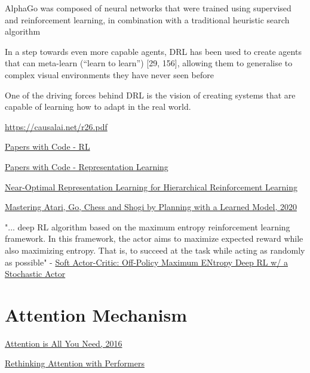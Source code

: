 AlphaGo
was composed of neural networks that were trained using
supervised and reinforcement learning, in combination with
a traditional heuristic search algorithm


In a step towards even more capable agents,
DRL has been used to create agents that can meta-learn (“learn
to learn”) [29, 156], allowing them to generalise to complex
visual environments they have never seen before

One of the
driving forces behind DRL is the vision of creating systems
that are capable of learning how to adapt in the real world.








\cite{sorokin2015deep}




\url{https://causalai.net/r26.pdf}

\href{https://paperswithcode.com/methods/area/reinforcement-learning}{Papers with Code - RL}

\href{https://paperswithcode.com/task/representation-learning}{Papers with Code - Representation Learning}

\href{https://paperswithcode.com/paper/near-optimal-representation-learning-for}{	Near-Optimal Representation Learning for Hierarchical Reinforcement Learning}

\href{https://arxiv.org/pdf/1911.08265.pdf}{Mastering Atari, Go, Chess and Shogi by Planning with a Learned Model, 2020}

"... deep RL algorithm based on the
maximum entropy reinforcement learning framework. In this framework, the actor aims to maximize expected reward while also maximizing entropy. That is, to succeed at the task while acting as randomly as possible" - \href{https://arxiv.org/pdf/1801.01290.pdf}{Soft Actor-Critic: Off-Policy Maximum ENtropy Deep RL w/ a Stochastic Actor} 


\chapter{Attention Mechanism}




\href{https://proceedings.neurips.cc/paper/2017/file/3f5ee243547dee91fbd053c1c4a845aa-Paper.pdf}{Attention is All You Need, 2016}

\href{https://arxiv.org/pdf/2009.14794.pdf}{Rethinking Attention with Performers}





